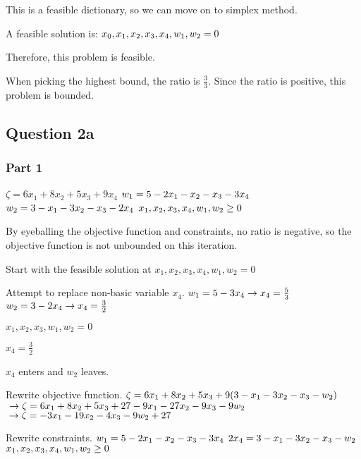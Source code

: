 \documentclass{article}
\begin{document}
This is a feasible dictionary, so we can move on to simplex method.

A feasible solution is:
$\\ x_0, x_1, x_2, x_3, x_4, w_1, w_2 = 0$

Therefore, this problem is feasible.

When picking the highest bound, the ratio is $\frac{3}{3}$. Since the ratio is positive, this problem is bounded.

\newpage
\subsection*{Question 2a}
\subsubsection*{Part 1}
$\zeta = 6x_1 + 8x_2 + 5x_3 + 9x_4$
$\\ w_1 = 5 - 2x_1 - x_2 - x_3 - 3x_4$
$\\ w_2 = 3 - x_1 - 3x_2 - x_3 - 2x_4$
$\\ x_1, x_2, x_3, x_4, w_1, w_2 \geq 0$

By eyeballing the objective function and constraints, no ratio is negative, so the objective function is not unbounded on this iteration.

Start with the feasible solution at $x_1, x_2, x_3, x_4, w_1, w_2 = 0$

Attempt to replace non-basic variable $x_4$.
$\\ w_1 = 5 - 3x_4 \to x_4 = \frac{5}{3}$
$\\ w_2 = 3 - 2x_4 \to x_4 = \frac{3}{2}$

$x_1, x_2, x_3, w_1, w_2 = 0$

$x_4 = \frac{3}{2}$

$x_4$ enters and $w_2$ leaves.

Rewrite objective function.
$\\\zeta = 6x_1 + 8x_2 + 5x_3 + 9(3 - x_1 - 3x_2 - x_3 - w_2)$
$\\\to \zeta = 6x_1 + 8x_2 + 5x_3 + 27 - 9x_1 - 27x_2 - 9x_3 - 9w_2$
$\\\to \zeta = - 3x_1 - 19x_2 - 4x_3 - 9w_2 + 27$

Rewrite constraints.
$\\ w_1 = 5 - 2x_1 - x_2 - x_3 - 3x_4$
$\\ 2x_4 = 3 - x_1 - 3x_2 - x_3 - w_2$
$\\ x_1, x_2, x_3, x_4, w_1, w_2 \geq 0$
\end{document}
